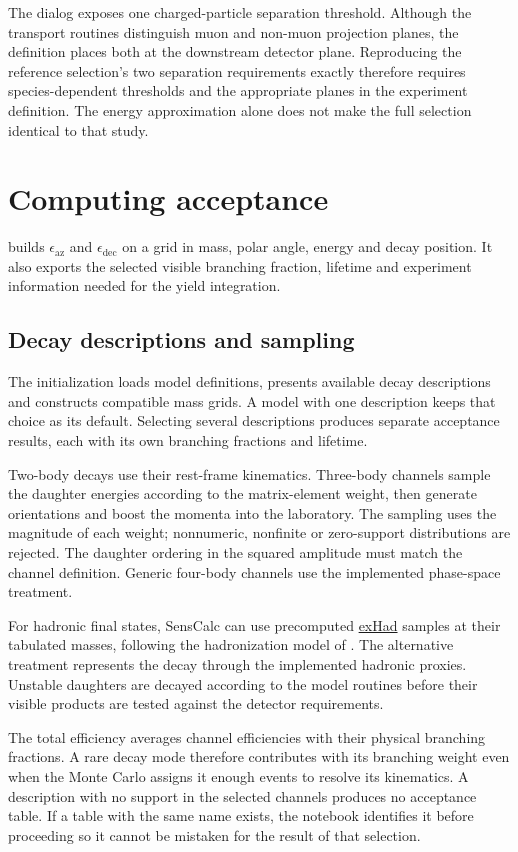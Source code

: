The dialog exposes one charged-particle separation threshold. Although the transport routines distinguish muon and non-muon projection planes, the  definition places both at the downstream detector plane. Reproducing the reference selection's two separation requirements exactly therefore requires species-dependent thresholds and the appropriate planes in the experiment definition. The energy approximation alone does not make the full selection identical to that study.

\section{Computing acceptance}\label{sec:acceptance}
 builds $\epsilon_{\mathrm{az}}$ and $\epsilon_{\mathrm{dec}}$ on a grid in mass, polar angle, energy and decay position. It also exports the selected visible branching fraction, lifetime and experiment information needed for the yield integration.

\subsection{Decay descriptions and sampling}
The initialization loads model definitions, presents available decay descriptions and constructs compatible mass grids. A model with one description keeps that choice as its default. Selecting several descriptions produces separate acceptance results, each with its own branching fractions and lifetime.

Two-body decays use their rest-frame kinematics. Three-body channels sample the daughter energies according to the matrix-element weight, then generate orientations and boost the momenta into the laboratory. The sampling uses the magnitude of each weight; nonnumeric, nonfinite or zero-support distributions are rejected. The daughter ordering in the squared amplitude must match the channel definition. Generic four-body channels use the implemented phase-space treatment.

For hadronic final states, SensCalc can use precomputed \href{https://github.com/maksymovchynnikov/exHad}{exHad} samples at their tabulated masses, following the hadronization model of . The alternative treatment represents the decay through the implemented hadronic proxies. Unstable daughters are decayed according to the model routines before their visible products are tested against the detector requirements.

The total efficiency averages channel efficiencies with their physical branching fractions. A rare decay mode therefore contributes with its branching weight even when the Monte Carlo assigns it enough events to resolve its kinematics. A description with no support in the selected channels produces no acceptance table. If a table with the same name exists, the notebook identifies it before proceeding so it cannot be mistaken for the result of that selection.

